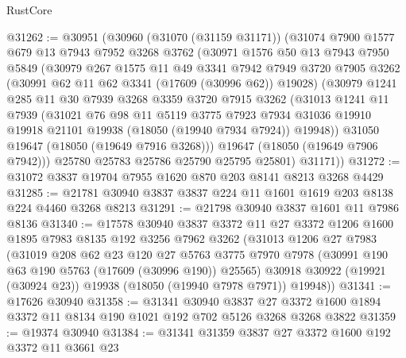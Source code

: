 \begin{lexlean}{RustCore}
\begin{coremodule}
@31262 := @30951
    (@30960
      (@31070 (@31159 @31171))
      (@31074
        @7900
        @1577
        @679
        @13
        @7943
        @7952
        @3268
        @3762
        (@30971
          @1576
          @50
          @13
          @7943
          @7950
          @5849
          (@30979
            @267
            @1575
            @11
            @49
            @3341
            @7942
            @7949
            @3720
            @7905
            @3262
            (@30991 @62 @11 @62 @3341 (@17609 (@30996 @62)) @19028)
            (@30979
              @1241
              @285
              @11
              @30
              @7939
              @3268
              @3359
              @3720
              @7915
              @3262
              (@31013
                @1241
                @11
                @7939
                (@31021
                  @76
                  @98
                  @11
                  @5119
                  @3775
                  @7923
                  @7934
                  @31036
                  @19910
                  @19918
                  @21101
                  @19938
                  (@18050 (@19940 @7934 @7924))
                  @19948))
              @31050
              @19647
              (@18050 (@19649 @7916 @3268)))
            @19647
            (@18050 (@19649 @7906 @7942)))
          @25780
          @25783
          @25786
          @25790
          @25795
          @25801)
        @31171))
@31272 := @31072 @3837 @19704 @7955 @1620 @870 @203 @8141 @8213 @3268 @4429
@31285 := @21781 @30940 @3837 @3837 @224 @11 @1601 @1619 @203 @8138 @224 @4460 @3268 @8213
@31291 := @21798 @30940 @3837 @1601 @11 @7986 @8136
@31340 := @17578
    @30940
    @3837
    @3372
    @11
    @27
    @3372
    @1206
    @1600
    @1895
    @7983
    @8135
    @192
    @3256
    @7962
    @3262
    (@31013
      @1206
      @27
      @7983
      (@31019
        @208
        @62
        @23
        @120
        @27
        @5763
        @3775
        @7970
        @7978
        (@30991 @190 @63 @190 @5763 (@17609 (@30996 @190)) @25565)
        @30918
        @30922
        (@19921 (@30924 @23))
        @19938
        (@18050 (@19940 @7978 @7971))
        @19948))
@31341 := @17626 @30940
@31358 := @31341
    @30940
    @3837
    @27
    @3372
    @1600
    @1894
    @3372
    @11
    @8134
    @190
    @1021
    @192
    @702
    @5126
    @3268
    @3268
    @3822
@31359 := @19374 @30940
@31384 := @31341
    @31359
    @3837
    @27
    @3372
    @1600
    @192
    @3372
    @11
    @3661
    @23

\end{coremodule}
\end{lexlean}
